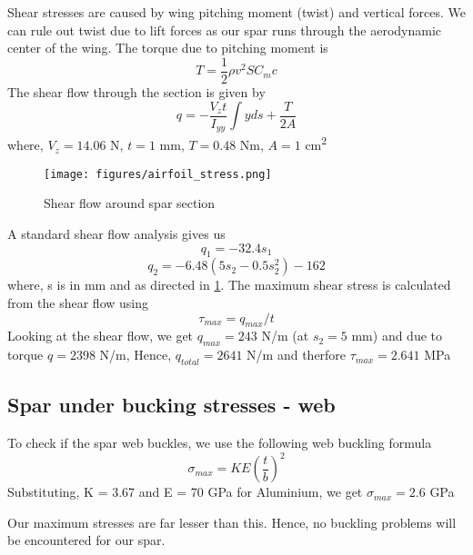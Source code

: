 \documentclass[a4paper,10pt]{report}
\begin{document}
Shear stresses are caused by wing pitching moment (twist) and vertical forces. We can rule out twist due to lift forces as our spar runs through the aerodynamic center of the wing. The torque due to pitching moment is 
\begin{equation} T = \frac{1}{2}\rho v^2SC_mc \end{equation}
The shear flow through the section is given by
\begin{equation} q = -\frac{V_zt}{I_{yy}}\int{yds} + \frac{T}{2A} \end{equation}
where, $V_z = 14.06$ N, $t = 1$ mm, $T = 0.48$ Nm, $A = 1$ cm\textsuperscript{2}\\
\begin{figure}[H]
    \begin{center}
      \texttt{[image: figures/airfoil\_stress.png]}
\caption{Shear flow around spar section}
       \label{fig:shearflow}
    \end{center}
\end{figure}
A standard shear flow analysis gives us
\[ q_1 = -32.4s_1\]
\[ q_2 = -6.48(5s_2 - 0.5s_2^2)-162\]
where, s is in mm and as directed in \ref{fig:shearflow}. The maximum shear stress is calculated from the shear flow using
\begin{equation} \tau_{max} = q_{max}/t \end{equation}
Looking at the shear flow, we get $q_{max} = 243$ N/m (at $s_2 = 5$ mm) and due to torque $q = 2398$ N/m, Hence, $q_{total} = 2641$ N/m and therfore $\tau_{max} = 2.641$ MPa

\subsection{Spar under bucking stresses - web}
To check if the spar web buckles, we use the following web buckling formula
\begin{equation} \sigma_{max} = KE\left(\frac{t}{b}\right)^2 \end{equation}
Substituting, K = 3.67 and E = 70 GPa for Aluminium, we get $\sigma_{max} = 2.6$ GPa 

Our maximum stresses are far lesser than this. Hence, no buckling problems will be encountered for our spar.




\end{document}
